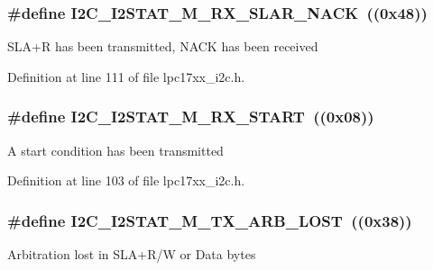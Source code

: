 \subsubsection[{\texorpdfstring{I2\+C\+\_\+\+I2\+S\+T\+A\+T\+\_\+\+M\+\_\+\+R\+X\+\_\+\+S\+L\+A\+R\+\_\+\+N\+A\+CK}{I2C_I2STAT_M_RX_SLAR_NACK}}]{\setlength{\rightskip}{0pt plus 5cm}\#define I2\+C\+\_\+\+I2\+S\+T\+A\+T\+\_\+\+M\+\_\+\+R\+X\+\_\+\+S\+L\+A\+R\+\_\+\+N\+A\+CK~((0x48))}\hypertarget{group___i2_c___private___macros_gafe156febe3313a9f3423776f97d0f24f}{}\label{group___i2_c___private___macros_gafe156febe3313a9f3423776f97d0f24f}
S\+L\+A+R has been transmitted, N\+A\+CK has been received 

Definition at line 111 of file lpc17xx\+\_\+i2c.\+h.

\subsubsection[{\texorpdfstring{I2\+C\+\_\+\+I2\+S\+T\+A\+T\+\_\+\+M\+\_\+\+R\+X\+\_\+\+S\+T\+A\+RT}{I2C_I2STAT_M_RX_START}}]{\setlength{\rightskip}{0pt plus 5cm}\#define I2\+C\+\_\+\+I2\+S\+T\+A\+T\+\_\+\+M\+\_\+\+R\+X\+\_\+\+S\+T\+A\+RT~((0x08))}\hypertarget{group___i2_c___private___macros_gab1f79137c62e306269633b005ad936da}{}\label{group___i2_c___private___macros_gab1f79137c62e306269633b005ad936da}
A start condition has been transmitted 

Definition at line 103 of file lpc17xx\+\_\+i2c.\+h.

\subsubsection[{\texorpdfstring{I2\+C\+\_\+\+I2\+S\+T\+A\+T\+\_\+\+M\+\_\+\+T\+X\+\_\+\+A\+R\+B\+\_\+\+L\+O\+ST}{I2C_I2STAT_M_TX_ARB_LOST}}]{\setlength{\rightskip}{0pt plus 5cm}\#define I2\+C\+\_\+\+I2\+S\+T\+A\+T\+\_\+\+M\+\_\+\+T\+X\+\_\+\+A\+R\+B\+\_\+\+L\+O\+ST~((0x38))}\hypertarget{group___i2_c___private___macros_ga79230136402441c7e233c63fd2f71bdf}{}\label{group___i2_c___private___macros_ga79230136402441c7e233c63fd2f71bdf}
Arbitration lost in S\+L\+A+\+R/W or Data bytes 

